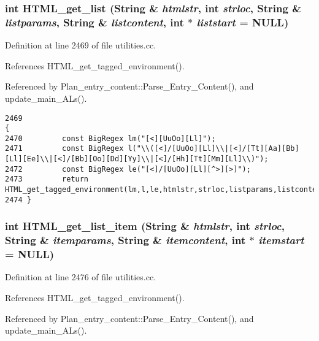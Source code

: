 \subsubsection{\setlength{\rightskip}{0pt plus 5cm}int HTML\_\-get\_\-list ({\bf String} \& {\em htmlstr}, int {\em strloc}, {\bf String} \& {\em listparams}, {\bf String} \& {\em listcontent}, int $\ast$ {\em liststart} = NULL)}\label{utilities_8cc_a56}




Definition at line 2469 of file utilities.cc.

References HTML\_\-get\_\-tagged\_\-environment().

Referenced by Plan\_\-entry\_\-content::Parse\_\-Entry\_\-Content(), and update\_\-main\_\-ALs().



\footnotesize\begin{verbatim}2469                                                                                                                    {
2470         const BigRegex lm("[<][UuOo][Ll]");
2471         const BigRegex l("\\([<]/[UuOo][Ll]\\|[<]/[Tt][Aa][Bb][Ll][Ee]\\|[<]/[Bb][Oo][Dd][Yy]\\|[<]/[Hh][Tt][Mm][Ll]\\)");
2472         const BigRegex le("[<]/[UuOo][Ll][^>][>]"); 
2473         return HTML_get_tagged_environment(lm,l,le,htmlstr,strloc,listparams,listcontent,liststart);
2474 }
\end{verbatim}\normalsize 
{}
\subsubsection{\setlength{\rightskip}{0pt plus 5cm}int HTML\_\-get\_\-list\_\-item ({\bf String} \& {\em htmlstr}, int {\em strloc}, {\bf String} \& {\em itemparams}, {\bf String} \& {\em itemcontent}, int $\ast$ {\em itemstart} = NULL)}\label{utilities_8cc_a57}




Definition at line 2476 of file utilities.cc.

References HTML\_\-get\_\-tagged\_\-environment().

Referenced by Plan\_\-entry\_\-content::Parse\_\-Entry\_\-Content(), and update\_\-main\_\-ALs().



